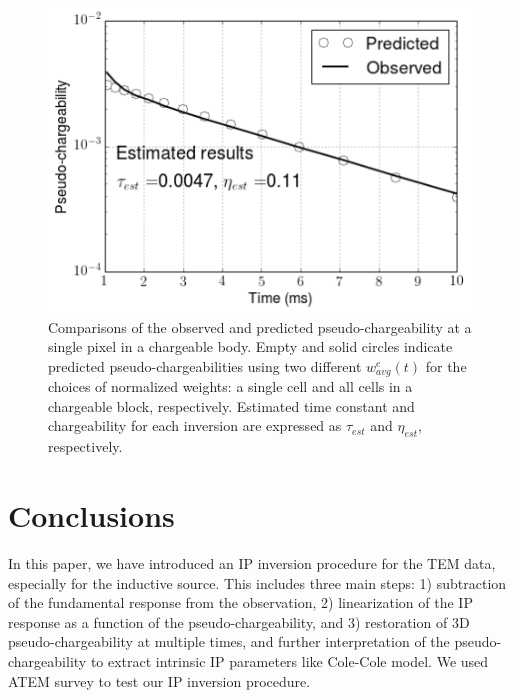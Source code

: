 \documentclass[a4paper, 11pt]{article}
\begin{document}
\begin{figure}[htb]
  \centering
  \includegraphics[width=1.\textwidth]{figures/IntrinsicIP.png}
  \caption{Comparisons of the observed and predicted pseudo-chargeability at a single pixel in a chargeable body. 
  Empty and solid circles indicate predicted pseudo-chargeabilities using two different $w^e_{avg}(t)$ for the choices of normalized weights: a single cell and all cells in a chargeable block, respectively. Estimated time constant and chargeability for each inversion are expressed as $\tau_{est}$ and $\eta_{est}$, respectively.}
  \label{F:IntrinsicIP}
\end{figure}
\clearpage

\section{Conclusions}
In this paper, we have introduced an IP inversion procedure for the TEM data, especially for the inductive source. 
This includes three main steps: 1) subtraction of the fundamental response from the observation, 2) linearization of the IP response as a function of the pseudo-chargeability, and 3) restoration of 3D pseudo-chargeability at multiple times, and further interpretation of the pseudo-chargeability to extract intrinsic IP parameters like Cole-Cole model. We used ATEM survey to test our IP inversion procedure.
\end{document}
